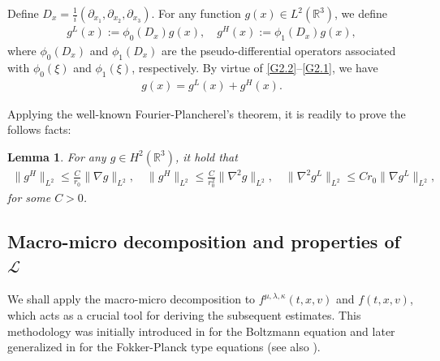 \documentclass[reqno,11pt]{amsart}
\theoremstyle{plain}
\newtheorem{lem}[thm]{Lemma}
\numberwithin{equation}{section}
\begin{document}
Define $D_x = \frac{1}{i} (\partial_{x_1}, \partial_{x_2}, \partial_{x_3})$.
 For any function $g(x) \in L^2(\mathbb{R}^3)$, we define  
\begin{align}\label{G2.1}  
g^{L}(x) := \phi_0(D_x)g(x), \quad g^{H}(x) := \phi_1(D_x)g(x),  
\end{align}  
where $\phi_0(D_x)$ and $\phi_1(D_x)$ are the pseudo-differential operators associated with $\phi_0(\xi)$ and $\phi_1(\xi)$, respectively.   By virtue of \eqref{G2.2}--\eqref{G2.1}, we have
\begin{align*}  
g(x) = g^{L}(x) + g^{H}(x).  
\end{align*}  

Applying the well-known Fourier-Plancherel's  theorem, it is readily to prove  the follows facts: 

\begin{lem}
For any $g \in H^2(\mathbb{R}^3)$, it hold that 
\begin{align}  \label{G2.3}
\|g^H\|_{L^2} \leq \frac{C}{r_0} \|\nabla g\|_{L^2}, \quad \|g^H\|_{L^2} \leq \frac{C}{r_0^2} \|\nabla^2 g\|_{L^2}, \quad \|\nabla^2 g^L\|_{L^2} \leq C r_0 \|\nabla g^L\|_{L^2},  
\end{align}
 for some $C>0$.  
\end{lem}



 
\subsection{Macro-micro decomposition and properties of   {\(\mathcal{L}\)} }
We shall apply the macro-micro decomposition to $f^{\mu,\lambda,\kappa}(t,x,v)$ and $f(t,x,v)$, which acts as a crucial tool for deriving the subsequent estimates. This methodology was initially introduced in \cite{GY-iumj-2004} for the Boltzmann equation and later generalized in \cite{DFT-2010-CMP} for the Fokker-Planck type equations (see also \cite{Mu-Wang-20,LNW-SAPM-2025,LNW-arXiv-2025}).
  
\end{document}
